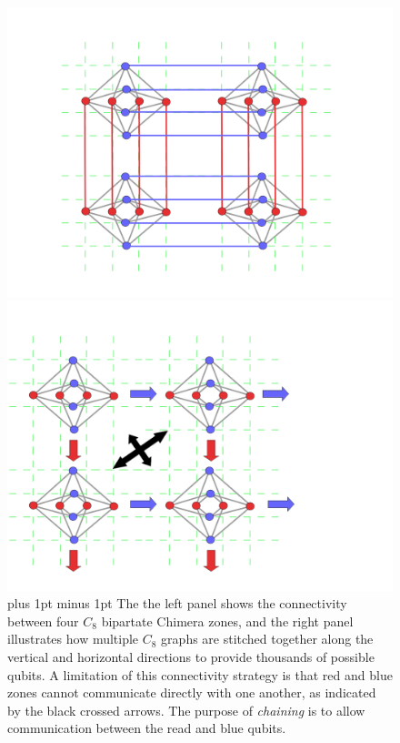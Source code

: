 \documentclass[preprint,12pt,eqsecnum,nofootinbib,amsmath,amssymb]{revtex4}
\newcommand{\footnoteskip}{\baselineskip 12pt plus 1pt minus 1pt}
\begin{document}
%
\begin{figure}[h!]
\begin{minipage}[c]{0.4\linewidth}
\includegraphics[scale=0.30]{figs/bipartate8_connect.png}
\end{minipage}
\hfill
\begin{minipage}[c]{0.4\linewidth}
\includegraphics[scale=0.28]{figs/bipartate8_connect_diagonal.png}
\end{minipage}
\caption{\footnoteskip
The the left panel shows the connectivity between four $C_8$ bipartate 
Chimera zones, and the right panel illustrates how multiple $C_8$
graphs are stitched together along the vertical and horizontal
directions to provide thousands of possible qubits. A limitation of
this connectivity strategy is that red and blue zones cannot
communicate directly with one another, as indicated by the black
crossed arrows. The purpose of {\em chaining} is to allow
communication between the read and blue qubits.  
}
\label{fig_bipartate8_connect}
\end{figure}
\end{document}
